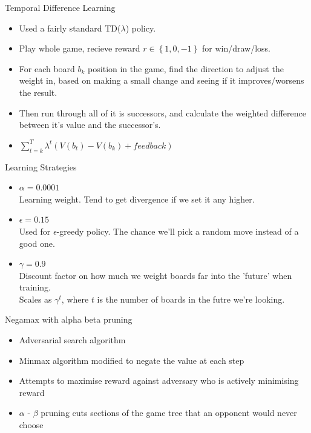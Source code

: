 \documentclass{beamer}
\begin{document}
\begin{frame}{Temporal Difference Learning}
   \begin{itemize}
  \item
  	Used a fairly standard TD($\lambda$) policy.
  \item
	Play whole game, recieve reward $r\in \left\{1,0,-1 \right\}$ for win/draw/loss.
  \item
	For each board $b_k$ position in the game, find the direction to adjust the weight in, based on making a small change and seeing if it improves/worsens the result.
 \item
	Then run through all of it is successors, and calculate the weighted difference between it's value and the successor's.
  \item
	$\sum_{t=k}^T \lambda^t \left ( V(b_t) - V(b_k) + feedback \right)$
  \end{itemize}
\end{frame}

\begin{frame}{Learning Strategies}
\begin{itemize}
	\item $\alpha = 0.0001$
		\\ Learning weight. Tend to get divergence if we set it any higher.
	
	\item $\epsilon = 0.15$
		\\ Used for $\epsilon$-greedy policy. The chance we'll pick a random move instead of a good one.
	\item $\gamma = 0.9$
		\\ Discount factor on how much we weight boards far into the 'future' when training.
		\\ Scales as $\gamma^t$, where $t$ is the number of boards in the futre we're looking.
	\end{itemize}
\end{frame}

\begin{frame}{Negamax with alpha beta pruning}
    \begin{itemize}
  \item
    Adversarial search algorithm
  \item
    Minmax algorithm modified to negate the value at each step
  \item
    Attempts to maximise reward against adversary who is actively minimising reward
  \item
   $\alpha$ - $\beta$ pruning cuts sections of the game tree that an opponent would never choose
  \end{itemize}
\end{frame}
\end{document}
